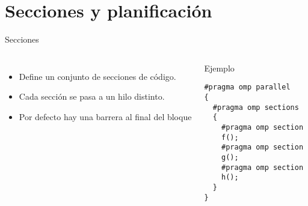 \section{Secciones y planificación}

\begin{frame}[t,fragile]{Secciones}
\begin{columns}[T]

\begin{itemize}
  \item Define un conjunto de secciones de código.
  \item Cada sección se pasa a un hilo distinto.
  \item Por defecto hay una barrera al final del bloque 
\end{itemize}

\begin{block}{Ejemplo}
\begin{lstlisting}
#pragma omp parallel
{
  #pragma omp sections
  {
    #pragma omp section
    f();
    #pragma omp section
    g();
    #pragma omp section
    h();
  }
}
\end{lstlisting}
\end{block}

\end{columns}
\end{frame}

